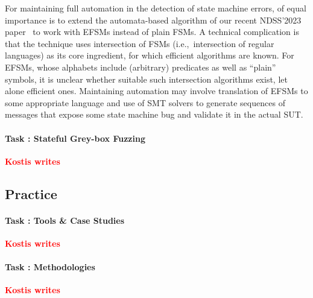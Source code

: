 \documentclass[11pt]{article}
\newcommand{\FIX}[1]{\textcolor{red}{\textbf{#1}}}
\newcounter{Task}
\newcommand{\task}[1]{\addtocounter{Task}{1}\paragraph{Task \theTask: #1}}
\newcommand{\significance}[1]{\vspace*{-0.5em}%
  \begin{quoting}\noindent\textbf{Significance:} #1\end{quoting}}
\newcommand{\myparagraph}{}
\let\myparagraph=\paragraph
\renewcommand{\paragraph}{\vspace{-3mm}\myparagraph}
\newcommand{\ie}{i.\/e.,\ }
\begin{document}
For maintaining full automation in the detection of state machine errors, of
equal importance is to extend the automata-based algorithm of our recent
NDSS'2023 paper~\cite{AutomataBased@NDSS-23} to work with EFSMs instead of
plain FSMs.  A technical complication is that the technique uses intersection
of FSMs (\ie intersection of regular languages) as its core ingredient, for
which efficient algorithms are known. For EFSMs, whose alphabets include
(arbitrary) predicates as well as ``plain'' symbols, it is unclear whether
suitable such intersection algorithms exist, let alone efficient ones.
Maintaining automation may involve translation of EFSMs to some appropriate
language and use of SMT solvers to generate sequences of messages that expose
some state machine bug and validate it in the actual SUT.


\task{Stateful Grey-box Fuzzing} \FIX{Kostis writes}


\subsection{Practice}
\task{Tools \& Case Studies} \FIX{Kostis writes}


\task{Methodologies} \FIX{Kostis writes}

\end{document}
